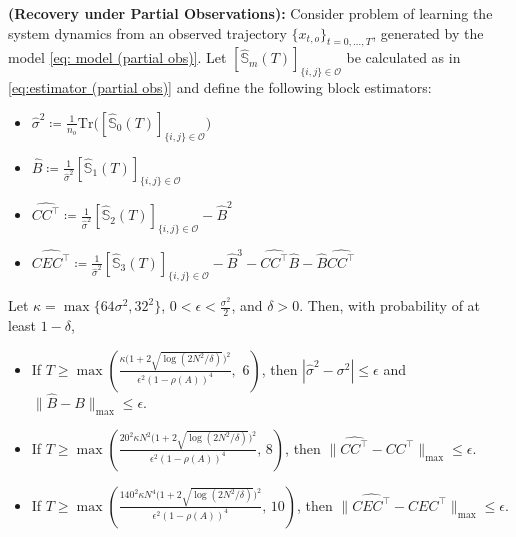 \documentclass[11pt]{article}
\begin{document}
\begin{corollary}
\label{corollary1}
\textbf{(Recovery under Partial Observations):} Consider problem of learning the system dynamics from an observed trajectory $\{x_{t,o}\}_{t=0,\dots,T}$, generated by the model \eqref{eq: model (partial obs)}. Let $[\hat{\mathbb{S}}_m(T)]_{\{i,j\}\in \mathcal{O}}$ be calculated as in \eqref{eq:estimator (partial obs)} and define the following block estimators:
\begin{itemize}
    \item $\hat{\sigma}^2 \coloneqq \frac{1}{n_o}\mathrm{Tr}\big([\hat{\mathbb{S}}_0(T)]_{\{i,j\}\in \mathcal{O}} \big)$
    \item $\hat{B} \coloneqq \frac{1}{\hat{\sigma}^2} [\hat{\mathbb{S}}_1(T)]_{\{i,j\}\in \mathcal{O}} $
    \item $\widehat{CC^\top} \coloneqq \frac{1}{\hat{\sigma}^2} [\hat{\mathbb{S}}_2(T)]_{\{i,j\}\in \mathcal{O}}  - \hat{B}^2$
    \item $\widehat{CEC^\top} \coloneqq \frac{1}{\hat{\sigma}^2} [\hat{\mathbb{S}}_3(T)]_{\{i,j\}\in \mathcal{O}}  - \hat{B}^3 - \widehat{CC^\top}\hat{B} - \hat{B}\widehat{CC^\top}$
\end{itemize}

Let $\kappa = \max\{64\sigma^2,32^2\}$, $0<\epsilon <\frac{\sigma^2}{2}$, and $\delta >0$. Then, with probability of at least $1-\delta$,
\begin{itemize} 
    \item If $T \ge \max\left(\frac{\kappa\Big(1+2\sqrt{\log(2N^2/\delta)}\Big)^2}{\epsilon^2(1-\rho(A))^4},  \,\,  6 \right)$, then $|\hat{\sigma}^2 - \sigma^2| \le \epsilon$ and $\|\hat{B} - B\|_{\max} \le \epsilon$. 
    \item If $T \ge \max\left(\frac{20^2\kappa N^2\Big(1+2\sqrt{\log(2N^2/\delta)}\Big)^2}{\epsilon^2(1-\rho(A))^4}, \, 8 \right)$, then $\|\widehat{CC^\top} - CC^\top\|_{\max} \le \epsilon$.
    \item If $T \ge \max\left(\frac{140^2\kappa N^4\Big(1+2\sqrt{\log(2N^2/\delta)}\Big)^2}{\epsilon^2(1-\rho(A))^4}, \, 10 \right)$, then $\|\widehat{CEC^\top} - CEC^\top\|_{\max} \le \epsilon$.
\end{itemize}
\end{corollary}
\end{document}
